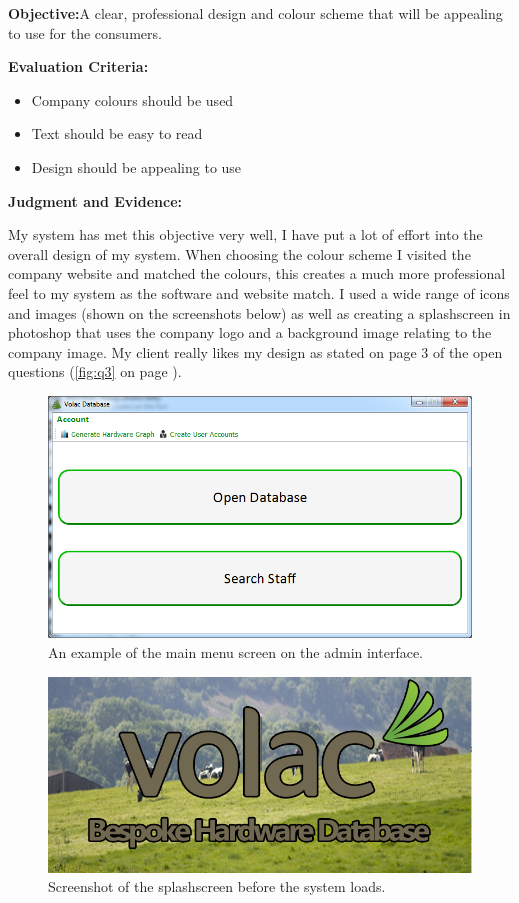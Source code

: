 \textbf{Objective:}A clear, professional design and colour scheme that will be appealing to use for the consumers.

\textbf{Evaluation Criteria:}
\begin{itemize}
\item{Company colours should be used}
\item{Text should be easy to read}
\item{Design should be appealing to use}
\end{itemize}

\textbf{Judgment and Evidence:}

My system has met this objective very well, I have put a lot of effort into the overall design of my system. When choosing the colour scheme I visited the company website and matched the colours, this creates a much more professional feel to my system as the software and website match. I used a wide range of icons and images (shown on the screenshots below) as well as creating a splashscreen in photoshop that uses the company logo and a background image relating to the company image. My client really likes my design as stated on page 3 of the open questions (\ref{fig:q3} on page \pageref{fig:q3}).

\begin{figure}[H]
    \includegraphics[width=\textwidth]{./Manual/Images/graph.png}
    \caption{An example of the main menu screen on the admin interface.} 
\end{figure}

\begin{figure}[H]
    \includegraphics[width=\textwidth]{./Evaluation/Images/splashscreen.png}
 \caption{Screenshot of the splashscreen before the system loads.} 
\end{figure}

